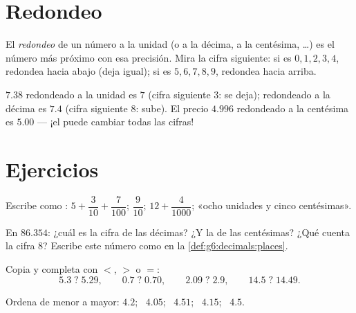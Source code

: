 \section{Redondeo}

\begin{definition}[Redondeo]\label{def:g6:decimals:rounding}
El \emph{redondeo} de un número a la unidad (o a la décima,
a la centésima, \dots) es el número más próximo con esa precisión. Mira la
cifra siguiente: si es $0,1,2,3,4$, redondea hacia abajo (deja igual); si es
$5,6,7,8,9$, redondea hacia arriba.
\end{definition}

\begin{example}
$7.38$ redondeado a la unidad es $7$ (cifra siguiente $3$: se deja); redondeado a
la décima es $7.4$ (cifra siguiente $8$: sube). El precio
$4.996$ redondeado a la centésima es $5.00$ --- ¡el  puede cambiar
todas las cifras!
\end{example}

\section{Ejercicios}

\begin{exercise}[$\star$]\label{exo:g6:decimals:1}
Escribe como : $5 + \dfrac{3}{10} + \dfrac{7}{100}$;
\quad $\dfrac{9}{10}$; \quad $12 + \dfrac{4}{1000}$;
\quad «ocho unidades y cinco centésimas».
\end{exercise}

\begin{exercise}[$\star$]\label{exo:g6:decimals:2}
En $86.354$: ¿cuál es la cifra de las décimas? ¿Y la de las centésimas? ¿Qué
cuenta la cifra $8$? Escribe este número como en la
\cref{def:g6:decimals:places}.
\end{exercise}

\begin{exercise}[$\star$]\label{exo:g6:decimals:3}
Copia y completa con $<$, $>$ o $=$:
\[
5.3 \;?\; 5.29, \qquad
0.7 \;?\; 0.70, \qquad
2.09 \;?\; 2.9, \qquad
14.5 \;?\; 14.49 .
\]
\end{exercise}

\begin{exercise}[$\star$]\label{exo:g6:decimals:4}
Ordena de menor a mayor:
$4.2$; \ $4.05$; \ $4.51$; \ $4.15$; \ $4.5$.
\end{exercise}


